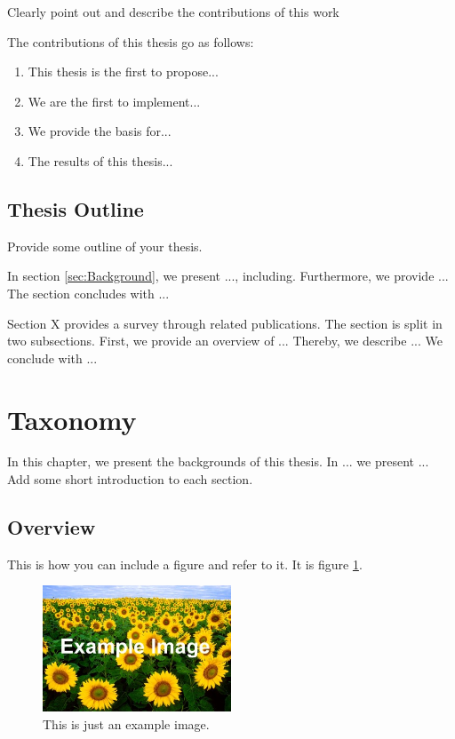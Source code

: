 Clearly point out and describe the contributions of this work

The contributions of this thesis go as follows: 
\begin{enumerate}
	\item This thesis is the first to propose...
	\item We are the first to implement...
	\item We provide the basis for...
	\item The results of this thesis...
\end{enumerate}
\clearpage

\subsection{Thesis Outline}

Provide some outline of your thesis.

  In section  \ref{sec:Background}, we present ..., including. Furthermore, we provide ... The section concludes with ...

 Section X provides a survey through related publications. The section is split in two subsections. First, we provide an overview of ... Thereby, we describe ... We conclude with ...

\section{Taxonomy}
\label{sec:Taxonomy}

In this chapter, we present the backgrounds of this thesis. In ... we present ... Add some short introduction to each section.

\subsection{Overview}
\label{sec:Overview}

This is how you can include a figure and refer to it. It is figure \ref{fig:Example}.

\begin{figure}[h!]
	\begin{center}
		\includegraphics[width=0.5\textwidth]{images/Example.jpg}
		\caption{This is just an example image.}
		\label{fig:Example}
	\end{center}
\end{figure}

